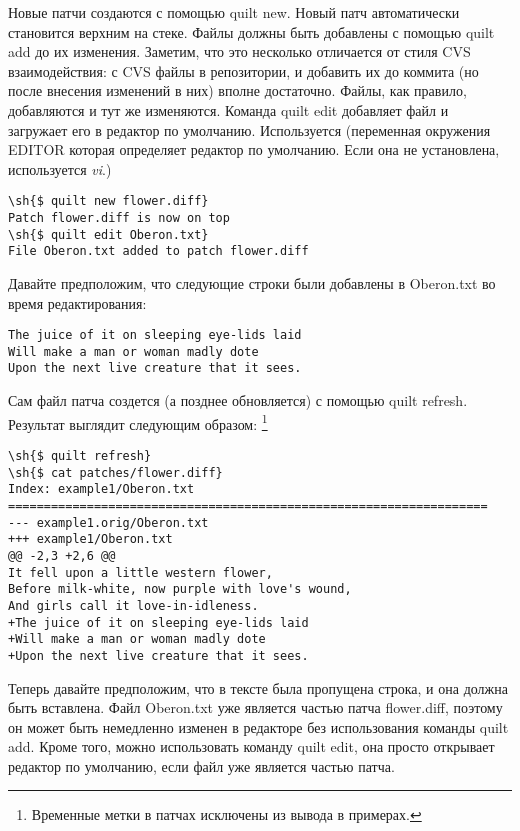 \documentclass{article}
\newcommand{\quilt}[1]{\textsf{quilt #1}}
\renewcommand{\sh}[1]{\textsl{#1}}
\newcommand{\prog}[1]{\textit{#1}}
\begin{document}
Новые патчи создаются с помощью \quilt{new}. Новый патч автоматически становится верхним на стеке. Файлы должны быть добавлены с помощью \quilt{add} до их изменения. Заметим, что это несколько отличается от стиля CVS взаимодействия: с CVS файлы в репозитории, и добавить их до коммита (но после внесения изменений в них) вполне достаточно. Файлы, как правило, добавляются и тут же изменяются. Команда \quilt{edit} добавляет файл и загружает его в редактор по умолчанию. Используется (переменная окружения \textsf{EDITOR} которая определяет редактор по умолчанию. Если она не установлена, используется \prog{vi}.)

\begin{small}
\begin{Verbatim}
\sh{$ quilt new flower.diff}
Patch flower.diff is now on top
\sh{$ quilt edit Oberon.txt}
File Oberon.txt added to patch flower.diff
\end{Verbatim}
\end{small}

Давайте предположим, что следующие строки были добавлены в \textsf{Oberon.txt} во время редактирования:

\begin{small}
\begin{Verbatim}
The juice of it on sleeping eye-lids laid
Will make a man or woman madly dote
Upon the next live creature that it sees.
\end{Verbatim}
\end{small}

Сам файл патча создется (а позднее обновляется) с помощью \quilt{refresh}. Результат выглядит следующим образом: \footnote{Временные метки в патчах исключены из вывода в примерах.}

\begin{small}
\begin{Verbatim}
\sh{$ quilt refresh}
\sh{$ cat patches/flower.diff}
Index: example1/Oberon.txt
===================================================================
--- example1.orig/Oberon.txt
+++ example1/Oberon.txt
@@ -2,3 +2,6 @@
It fell upon a little western flower,
Before milk-white, now purple with love's wound,
And girls call it love-in-idleness.
+The juice of it on sleeping eye-lids laid
+Will make a man or woman madly dote
+Upon the next live creature that it sees.
\end{Verbatim}
\end{small}

Теперь давайте предположим, что в тексте была пропущена строка, и она должна быть вставлена. Файл \textsf{Oberon.txt} уже является частью патча \textsf{flower.diff}, поэтому он может быть немедленно изменен в редакторе без использования команды \quilt{add}. Кроме того, можно использовать команду \quilt{edit}, она просто открывает редактор по умолчанию, если файл уже является частью патча.
\end{document}
